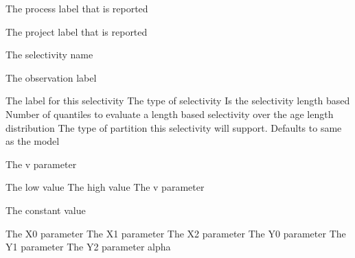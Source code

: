  {The process label that is reported}
\par\textbf{}\par
{} {The project label that is reported}
\par\textbf{}\par
\par\textbf{}\par
{} {The selectivity name}
\par\textbf{}\par
{} {The observation label}
\par\textbf{}\par
\par\textbf{}\par
{}\par\par
{} {The label for this selectivity}
 {The type of selectivity}
 {Is the selectivity length based}
 {Number of quantiles to evaluate a length based selectivity over the age length distribution}
 {The type of partition this selectivity will support. Defaults to same as the model}
 {}
 {}
\par\textbf{}\par
{} {The v parameter}
\par\textbf{}\par
{} {The low value}
 {The high value}
 {The v parameter}
\par\textbf{}\par
{} {The constant value}
\par\textbf{}\par
{} {The X0 parameter}
 {The X1 parameter}
 {The X2 parameter}
 {The Y0 parameter}
 {The Y1 parameter}
 {The Y2 parameter}
 {alpha}
\par\textbf{}\par
